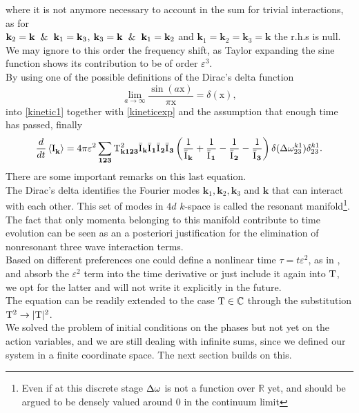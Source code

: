 where it is not anymore necessary to account in the sum for trivial 
interactions, as for \\ $\mathbf{k}_2=\mathbf{k} \hspace{2mm}\&\hspace{2mm} \mathbf{k}_1 = \mathbf{k}_3$, $\mathbf{k}_3=\mathbf{k} \hspace{2mm}\& \hspace{2mm}\mathbf{k}_1=\mathbf{k}_2$ 
and $\mathbf{k}_1=\mathbf{k}_2=\mathbf{k}_3=\mathbf{k}$ the r.h.s is null.\\
We may ignore to this order the frequency shift, as Taylor expanding the sine function shows its contribution to be of order $\varepsilon^3$. \\
By using one of the possible definitions of the Dirac's delta function
\begin{equation}
    \underset{a \rightarrow \infty}{\lim} \frac{\sin(a \mathrm{x})}{\pi\mathrm{x}} = \delta(\mathrm{x}),
    \label{delta}
\end{equation}
into \eqref{kinetic1} together with \eqref{kineticexp} and the assumption that enough time has passed, finally
\begin{equation}
    \frac{d}{dt} \left\langle \mathrm{I}^{}_\mathbf{k}\right\rangle = 4 \pi\varepsilon^2 \sum_{\mathbf{123}} \mathrm{T}^2_\mathbf{k123}\bar{\mathrm{I}^{}}_\mathbf{k}\bar{\mathrm{I}^{}}_\mathbf{1}\bar{\mathrm{I}^{}}_\mathbf{2}\bar{\mathrm{I}^{}}_\mathbf{3}
    \left(\frac{1}{\bar{\mathrm{I}^{}}_\mathbf{k}} + \frac{1}{\bar{\mathrm{I}^{}}_\mathbf{1}} - \frac{1}{\bar{\mathrm{I}^{}}_\mathbf{2}}- \frac{1}{\bar{\mathrm{I}^{}}_\mathbf{3}}  \right)
    \delta(\Delta{\omega}^{k1}_{23})\delta^{k1}_{23}.
    \label{kinetic2}
\end{equation}
There are some important remarks on this last equation. \\
The Dirac's delta identifies the Fourier modes $\mathbf{k}_1, \mathbf{k}_2,\mathbf{k}_3$ and $\mathbf{k}$ that can interact with each other.
This set of modes in $4d$ $k$-space is called the resonant manifold\footnote{Even if at this discrete stage $\Delta{\omega}$ is not a function over $\mathbb{R}$ yet,
and should be argued to be densely valued around $0$ in the continuum limit}. The fact that only momenta belonging to this manifold contribute to time evolution
can be seen as an a posteriori justification for the elimination of nonresonant three wave interaction terms. \\
Based on different preferences one could define a nonlinear time $\tau = t \varepsilon^2$, as in \cite{Onorato2020}, and absorb the 
$\varepsilon^2$ term into the time derivative or just include it again into $\mathrm{T}$, we opt for the latter and will not write it explicitly in the future. \\
The equation can be readily extended to the case $\mathrm{T} \in \mathbb{C}$ through the substitution $\mathrm{T}^2 \rightarrow |\mathrm{T}|^2$.\\
We solved the problem of initial conditions on the phases but not yet on the action variables, and we are still dealing with infinite sums, since we defined our system
in a finite coordinate space. The next section builds on this. \\

